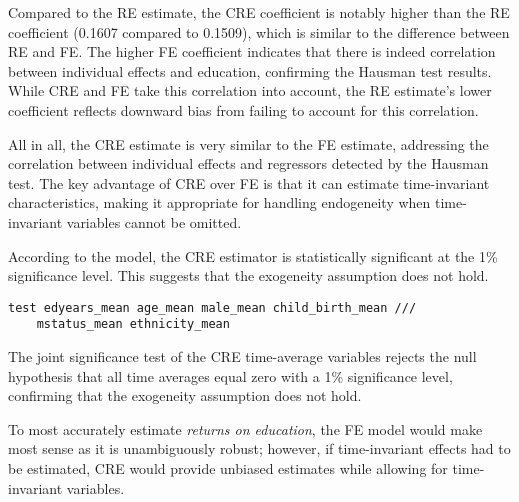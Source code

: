 Compared to the RE estimate, the CRE coefficient is notably higher than the RE coefficient (0.1607 compared to 0.1509), which is similar to the difference between RE and FE. The higher FE coefficient indicates that there is indeed correlation between individual effects and education, confirming the Hausman test results. While CRE and FE take this correlation into account, the RE estimate's lower coefficient reflects downward bias from failing to account for this correlation.

All in all, the CRE estimate is very similar to the FE estimate, addressing the correlation between individual effects and regressors detected by the Hausman test. The key advantage of CRE over FE is that it can estimate time-invariant characteristics, making it appropriate for handling endogeneity when time-invariant variables cannot be omitted.


According to the model, the  CRE estimator is statistically significant at the 1\% significance level. This suggests that the exogeneity assumption does not hold.

\begin{verbatim}
test edyears_mean age_mean male_mean child_birth_mean ///
    mstatus_mean ethnicity_mean
\end{verbatim}


The joint significance test of the CRE time-average variables rejects the null hypothesis that all time averages equal zero with a 1\% significance level, confirming that the exogeneity assumption does not hold.

To most accurately estimate \emph{returns on education}, the FE model would make most sense as it is unambiguously robust; however, if time-invariant effects had to be estimated, CRE would provide unbiased estimates while allowing for time-invariant variables.



